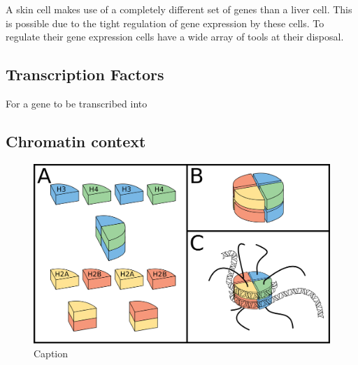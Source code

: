 A skin cell makes use of a completely different set of genes than a liver cell. This is possible due to the tight regulation of gene expression by these cells. To regulate their gene expression cells have a wide array of tools at their disposal. 

\subsection{Transcription Factors}

For a gene to be transcribed into

\subsection{Chromatin context}

\begin{figure}[H]
    \includegraphics[width=\linewidth]{ch1.Introduction/imgs/histones.png}
    \caption{Caption}
    \label{fig:histones}
\end{figure}

